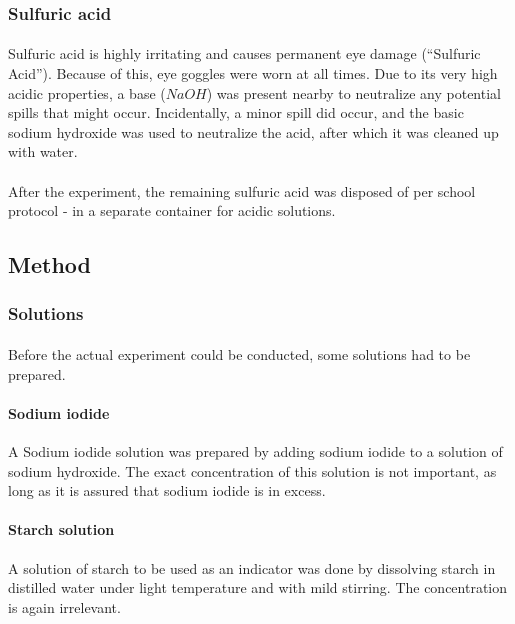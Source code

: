 \documentclass[a4paper]{article}
\begin{document}
\subsubsection{Sulfuric acid}

\paragraph*{}
Sulfuric acid is highly irritating and causes permanent eye damage (``Sulfuric
Acid''). Because of this, eye goggles were worn at all times. Due to its very
high acidic properties, a base ($NaOH$) was present nearby to neutralize any
potential spills that might occur. Incidentally, a minor spill did occur, and
the basic sodium hydroxide was used to neutralize the acid, after which it was
cleaned up with water.

\paragraph*{}
After the experiment, the remaining sulfuric acid was disposed of per
school protocol - in a separate container for acidic solutions.

\subsection{Method}

\subsubsection{Solutions}

\paragraph*{}
Before the actual experiment could be conducted, some solutions had to be
prepared.

\paragraph*{Sodium iodide}
A Sodium iodide solution was prepared by adding sodium iodide to a solution of
sodium hydroxide. The exact concentration of this solution is not important, as
long as it is assured that sodium iodide is in excess.

\paragraph*{Starch solution}
A solution of starch to be used as an indicator was done by dissolving starch
in distilled water under light temperature and with mild stirring. The
concentration is again irrelevant.
\end{document}
